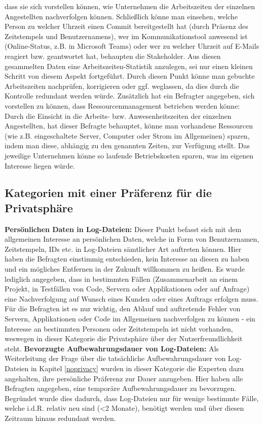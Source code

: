 dass sie sich vorstellen können, wie Unternehmen die Arbeitszeiten der einzelnen Angestellten nachverfolgen können. Schließlich könne man einsehen, welche Person zu welcher Uhrzeit einen Commit bereitgestellt hat (durch Präsenz des Zeitstempels und Benutzernamens), wer im Kommunikationstool anwesend ist (Online-Status, z.B. in Microsoft Teams) oder wer zu welcher Uhrzeit auf E-Mails reagiert bzw. geantwortet hat, behaupten die Stakeholder.
Aus diesen gesammelten Daten eine Arbeitszeiten-Statistik anzulegen, sei nur einen kleinen Schritt von diesem Aspekt fortgeführt. Durch diesen Punkt könne man gebuchte Arbeitszeiten nachprüfen, korrigieren oder ggf. weglassen, da dies durch die Kontrolle redundant werden würde. \newline
Zusätzlich hat ein Befragter angegeben, sich vorstellen zu können, dass Ressourcenmanagement betrieben werden könne: Durch die Einsicht in die Arbeits- bzw. Anwesenheitszeiten der einzelnen Angestellten, hat dieser Befragte behauptet, könne man vorhandene Ressourcen (wie z.B. eingeschaltete Server, Computer oder Strom im Allgemeinen) sparen, indem man diese, abhängig zu den genannten Zeiten, zur Verfügung stellt. Das jeweilige Unternehmen
könne so laufende Betriebskosten sparen, was im eigenen Interesse liegen würde.

\subsection{Kategorien mit einer Präferenz für die Privatsphäre} \label{privacy}
\textbf{Persönlichen Daten in Log-Dateien:} \newline
Dieser Punkt befasst sich mit dem allgemeinen Interesse an persönlichen Daten, welche in Form von Benutzernamen, Zeitstempeln, IDs etc. in Log-Dateien sämtlicher Art auftreten können. Hier haben die Befragten einstimmig
entschieden, kein Interesse an diesen zu haben und ein mögliches Entfernen in der Zukunft willkommen zu heißen. Es wurde lediglich angegeben, dass in bestimmten Fällen (Zusammenarbeit an einem Projekt, 
in Testfällen von Code, Servern oder Applikationen oder auf Anfrage) eine Nachverfolgung auf Wunsch eines Kunden oder eines Auftrags erfolgen muss. \newline Für die Befragten ist es nur wichtig, den Ablauf und auftretende Fehler 
von Servern, Applikationen oder Code im Allgemeinen nachverfolgen zu können - ein Interesse an bestimmten Personen oder Zeitstempeln ist nicht vorhanden, weswegen in dieser Kategorie die Privatsphäre über der Nutzerfreundlichkeit
steht. \newline \newline
\textbf{Bevorzugte Aufbewahrungsdauer von Log-Dateien:} \newline
Als Weiterleitung der Frage über die tatsächliche Aufbewahrungsdauer von Log-Dateien in Kapitel \ref{noprivacy} wurden in dieser Kategorie die Experten dazu angehalten, ihre persönliche Präferenz zur Dauer anzugeben. Hier haben alle 
Befragten angegeben, eine temporäre Aufbewahrungsdauer zu bevorzugen. Begründet wurde dies dadurch, dass Log-Dateien nur für wenige bestimmte Fälle, welche i.d.R. relativ neu sind (<2 Monate), benötigt werden und über diesen Zeitraum
hinaus redundant werden.

